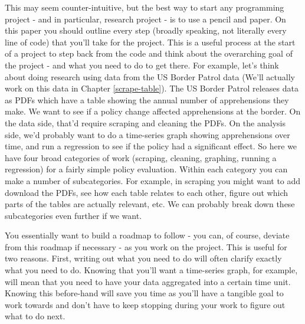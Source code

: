 \documentclass[
]{krantz}
\begin{document}
This may seem counter-intuitive, but the best way to start any programming project - and in particular, research project - is to use a pencil and paper. On this paper you should outline every step (broadly speaking, not literally every line of code) that you'll take for the project. This is a useful process at the start of a project to step back from the code and think about the overarching goal of the project - and what you need to do to get there. For example, let's think about doing research using data from the US Border Patrol data (We'll actually work on this data in Chapter \ref{scrape-table}). The US Border Patrol releases data as PDFs which have a table showing the annual number of apprehensions they make. We want to see if a policy change affected apprehensions at the border. On the data side, that'd require scraping and cleaning the PDFs. On the analysis side, we'd probably want to do a time-series graph showing apprehensions over time, and run a regression to see if the policy had a significant effect. So here we have four broad categories of work (scraping, cleaning, graphing, running a regression) for a fairly simple policy evaluation. Within each category you can make a number of subcategories. For example, in scraping you might want to add download the PDFs, see how each table relates to each other, figure out which parts of the tables are actually relevant, etc. We can probably break down these subcategories even further if we want.

You essentially want to build a roadmap to follow - you can, of course, deviate from this roadmap if necessary - as you work on the project. This is useful for two reasons. First, writing out what you need to do will often clarify exactly what you need to do. Knowing that you'll want a time-series graph, for example, will mean that you need to have your data aggregated into a certain time unit. Knowing this before-hand will save you time as you'll have a tangible goal to work towards and don't have to keep stopping during your work to figure out what to do next.
\end{document}
